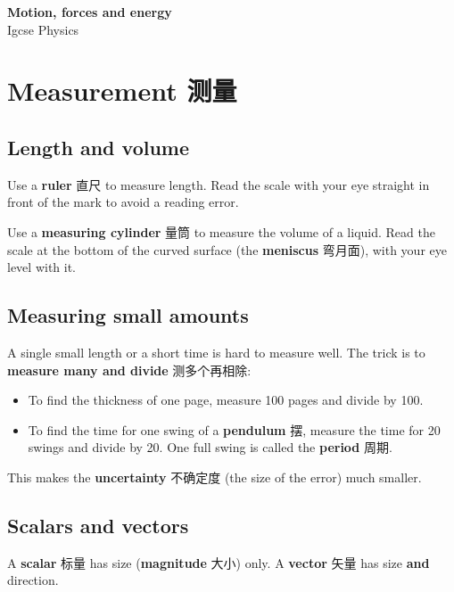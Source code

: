 \documentclass[11pt]{article}
\begin{document}
\begin{center}
  {\LARGE\bfseries Motion, forces and energy}\\[0.35em]
  {\large Igcse Physics}
\end{center}
\vspace{0.6em}

\section*{Measurement 测量}

\subsection*{Length and volume}

Use a \textbf{ruler} 直尺 to measure length. Read the scale with your eye straight in front of the mark to avoid a reading error.

Use a \textbf{measuring cylinder} 量筒 to measure the volume of a liquid. Read the scale at the bottom of the curved surface (the \textbf{meniscus} 弯月面), with your eye level with it.

\subsection*{Measuring small amounts}

A single small length or a short time is hard to measure well. The trick is to \textbf{measure many and divide} 测多个再相除:

\begin{itemize}
\item To find the thickness of one page, measure 100 pages and divide by 100.

\item To find the time for one swing of a \textbf{pendulum} 摆, measure the time for 20 swings and divide by 20. One full swing is called the \textbf{period} 周期.

\end{itemize}

This makes the \textbf{uncertainty} 不确定度 (the size of the error) much smaller.

\subsection*{Scalars and vectors}

A \textbf{scalar} 标量 has size (\textbf{magnitude} 大小) only. A \textbf{vector} 矢量 has size \textbf{and} direction.
\end{document}
